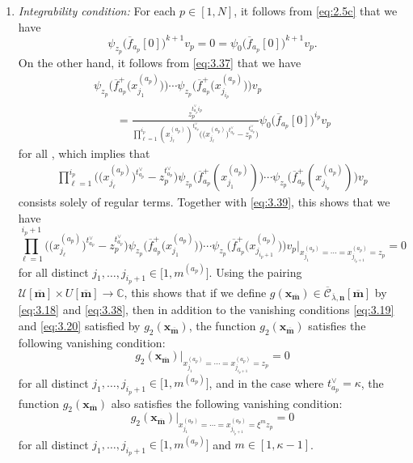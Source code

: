 \documentclass[10pt,a4paper]{amsart}
\numberwithin{equation}{section}
\begin{document}
\begin{enumerate}
\item[$(4)$] \emph{Integrability condition:} For each $p\in[1,N]$, it follows from \eqref{eq:2.5c} that we have
\begin{equation}\label{eq:3.39}
\psi_{z_p}\bigl(\overline{f}_{a_p}[0]\bigr)^{k+1}v_p
=0
=\psi_0\bigl(\overline{f}_{a_p}[0]\bigr)^{k+1}v_p.
\end{equation}
On the other hand, it follows from \eqref{eq:3.37} that we have
\begin{gather*}
\psi_{z_p}\bigl(\overline{f}_{a_p}^+\bigl(x_{j_1}^{(a_p)}\bigr)\bigr) \cdots\psi_{z_p}\bigl(\overline{f}_{a_p}^+\bigl(x_{j_{i_p}} ^{(a_p)}\bigr)\bigr) v_p\\
\qquad
=\frac{z_p^{t_{a_p}^{\vee}i_p}}{\prod_{\ell=1} ^{i_p}(x_{j_{\ell}}^{(a_p)})^{t_{a_p}^{\vee}}\bigl(\bigl(x_{j_{\ell}}^{(a_p)}\bigr) ^{t_{a_p}^{\vee}}-z_p^{t_{a_p}^{\vee}}\bigr)}\psi_0\bigl(\overline{f} _{a_p}[0]\bigr)^{i_p} v_p
\end{gather*}
for all , which implies that
\begin{gather*}
\prod_{\ell=1}^{i_p}\bigl(\bigl(x_{j_{\ell}}^{(a_p)}\bigr)^{t_{a_p}^{\vee}}-z_p^{t_{a_p}^{\vee}}\bigr)\psi_{z_p}\bigl(\overline{f}_{a_p}^+(x_{ j_1}^{(a_p)})\bigr)\cdots\psi_{z_p}\bigl(\overline{f}_{a_p}^+(x_{j_{i_p}}^{(a_p)})\bigr)v_p
\end{gather*}
consists solely of regular terms. Together with \eqref{eq:3.39}, this shows that we have
\begin{equation*}
\prod_{\ell=1}^{i_p+1}\bigl(\bigl(x_{j_{\ell}}^{(a_p)}\bigr)^{t_{a_p}^{\vee}}-z_p^{t_{a_p}^{\vee}}\bigr)\psi_{z_p}\bigl(\overline{f}_{a_p}^+\bigl(x_{ j_1}^{(a_p)}\bigr)\bigr)\cdots\psi_{z_p}\bigl(\overline{f}_{a_p}^+\bigl(x_{j_{i_p+1}}^{(a_p)}\bigr)\bigr)v_p\big|_{x_{j_1}^{(a_p)}=\cdots=x_{j_{i_p+1}}^{(a_p)}=z_p}=0
\end{equation*}
for all distinct $j_1,\dots,j_{i_p+1}\in\bigl[1,m^{(a_p)}\bigr]$. Using the pairing $\mathcal{U}[\overline{\mathbf{m}}]\times U[\overline{ \mathbf{m}}]\to\mathbb{C}$, this shows that if we define $g(\mathbf{x}_{\overline{\mathbf{m}}})\in\overline{ \mathcal{C}}_{\overline{\lambda},\mathbf{n}}[\overline{ \mathbf{m}}]$ by \eqref{eq:3.18} and \eqref{eq:3.38}, then in addition to the vanishing conditions \eqref{eq:3.19} and \eqref{eq:3.20} satisfied by $g_2(\mathbf{x}_{ \overline{\mathbf{m}}})$, the function $g_2(\mathbf{x}_{\overline{\mathbf{m}}})$ satisfies the following vanishing condition:
\begin{equation*}
g_2(\mathbf{x}_{\overline{\mathbf{m}}})|_{x_{j_1}^{(a_p)}=\cdots=x_{j_{i_p+1}}^{(a_p)}=z_p}=0
\end{equation*}
for all distinct $j_1,\dots,j_{i_p+1}\in\bigl[1,m^{(a_p)}\bigr]$, and in the case where $t_{a_p}^{\vee}=\kappa$, the function $g_2(\mathbf{x}_{\overline{\mathbf{m}}})$ also satisfies the following vanishing condition:
\begin{equation*}
g_2(\mathbf{x}_{\overline{\mathbf{m}}})|_{x_{j_1}^{(a_p)}=\cdots=x_{j_{i_p+1}}^{(a_p)}=\xi^m z_p}=0
\end{equation*}
for all distinct $j_1,\dots,j_{i_p+1}\in\bigl[1,m^{(a_p)}\bigr]$ and $m\in[1,\kappa-1]$.
\end{enumerate}
\end{document}

